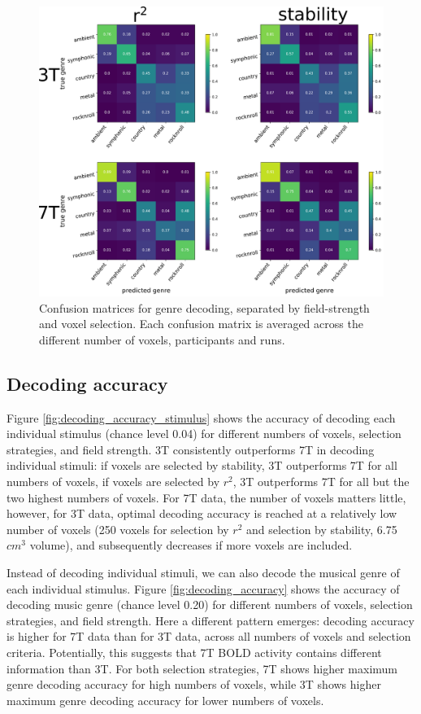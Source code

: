 \begin{figure}
  \centering
  \includegraphics[width=\linewidth]{pics/conf_mats.pdf}

  \caption{ Confusion matrices for genre decoding, separated by field-strength and voxel selection. Each confusion matrix is averaged across the different number of voxels, participants and runs.}

 \label{fig:confusion_matrices}
\end{figure}

\subsection*{Decoding accuracy}

Figure \ref{fig:decoding_accuracy_stimulus} shows the accuracy of decoding each individual stimulus (chance level 0.04) for different numbers of voxels, selection strategies, and field strength. 3T consistently outperforms 7T in decoding individual stimuli: if voxels are selected by stability, 3T outperforms 7T for all numbers of voxels, if voxels are selected by $r^{2}$, 3T outperforms 7T for all but the two highest numbers of voxels. For 7T data, the number of voxels matters little, however, for 3T data, optimal decoding accuracy is reached at a relatively low number of voxels (250 voxels for selection by $r^{2}$ and selection by stability, 6.75 $cm^{3}$ volume), and subsequently decreases if more voxels are included.

Instead of decoding individual stimuli, we can also decode the musical genre of each individual stimulus. Figure \ref{fig:decoding_accuracy} shows the accuracy of decoding music genre (chance level 0.20) for different numbers of voxels, selection strategies, and field strength. Here a different pattern emerges: decoding accuracy is higher for 7T data than for 3T data, across all numbers of voxels and selection criteria. Potentially, this suggests that 7T BOLD activity contains different information than 3T.  For both selection strategies, 7T shows higher maximum genre decoding accuracy for high numbers of voxels, while 3T shows higher maximum genre decoding accuracy for lower numbers of voxels.

